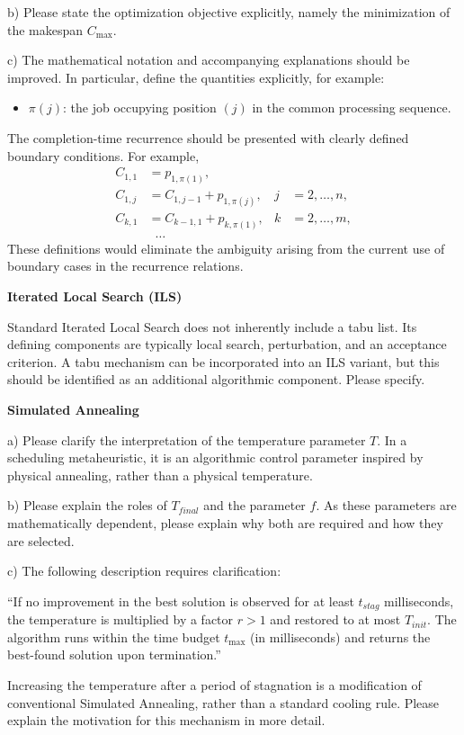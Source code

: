 \documentclass[12pt]{article}
\newcommand{\Cmax}{C_{\max}}
\begin{document}
b) Please state the optimization objective explicitly, namely the minimization of the makespan $\Cmax$.

c) The mathematical notation and accompanying explanations should be improved. In particular, define the quantities explicitly, for example:
\begin{itemize}[label=-]
\item $\pi(j)$: the job occupying position $(j)$ in the common processing sequence.
\end{itemize}
The completion-time recurrence should be presented with clearly defined boundary conditions. For example,
\begin{align*}
C_{1,1} &= p_{1,\pi(1)},\\
C_{1,j} &= C_{1,j-1}+p_{1,\pi(j)}, & j &= 2,\ldots,n,\\
C_{k,1} &= C_{k-1,1}+p_{k,\pi(1)}, & k &= 2,\ldots,m,\\
&\;\;\ldots
\end{align*}
These definitions would eliminate the ambiguity arising from the current use of boundary cases in the recurrence relations.

\textbf{Iterated Local Search (ILS)}

Standard Iterated Local Search does not inherently include a tabu list. Its defining components are typically local search, perturbation, and an acceptance criterion. A tabu mechanism can be incorporated into an ILS variant, but this should be identified as an additional algorithmic component. Please specify.

\textbf{Simulated Annealing}

a) Please clarify the interpretation of the temperature parameter $T$. In a scheduling metaheuristic, it is an algorithmic control parameter inspired by physical annealing, rather than a physical temperature.

b) Please explain the roles of $T_{final}$ and the parameter $f$. As these parameters are mathematically dependent, please explain why both are required and how they are selected.

c) The following description requires clarification:

``If no improvement in the best solution is observed for at least $t_{stag}$ milliseconds, the temperature is multiplied by a factor $r>1$ and restored to at most $T_{init}$. The algorithm runs within the time budget $t_{\max}$ (in milliseconds) and returns the best-found solution upon termination.''

Increasing the temperature after a period of stagnation is a modification of conventional Simulated Annealing, rather than a standard cooling rule. Please explain the motivation for this mechanism in more detail.
\end{document}

